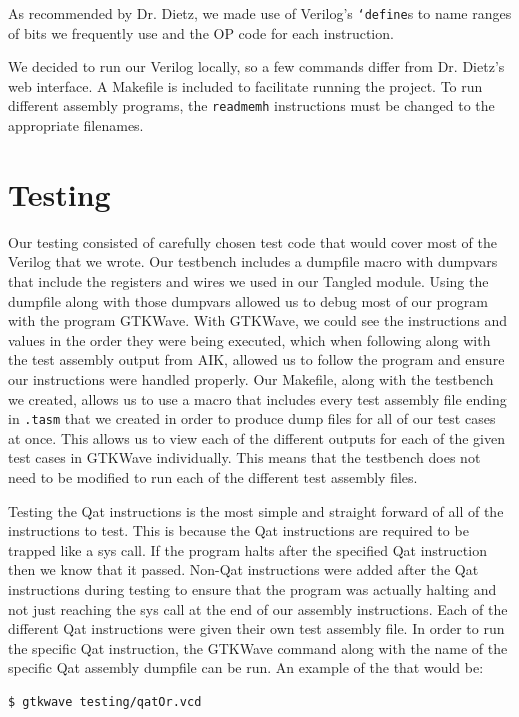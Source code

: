 \documentclass[sigconf, nonacm=true, screen=true]{acmart}
\begin{document}
As recommended by Dr. Dietz, we made use of Verilog's \texttt{`define}s to name ranges of bits we frequently use and the OP code for each instruction.

We decided to run our Verilog locally, so a few commands differ from Dr. Dietz's web interface. A Makefile is included to facilitate running the project. To run different assembly programs, the \texttt{readmemh} instructions must be changed to the appropriate filenames.


\section{Testing}
Our testing consisted of carefully chosen test code that would cover most of the Verilog that we wrote. Our testbench includes a dumpfile macro with dumpvars that include the registers and wires we used in our Tangled module. Using the dumpfile along with those dumpvars allowed us to debug most of our program with the program GTKWave. With GTKWave, we could see the instructions and values in the order they were being executed, which when following along with the test assembly output from AIK, allowed us to follow the program and ensure our instructions were handled properly. Our Makefile, along with the testbench we created, allows us to use a macro that includes every test assembly file ending in \texttt{.tasm} that we created in order to produce dump files for all of our test cases at once. This allows us to view each of the different outputs for each of the given test cases in GTKWave individually. This means that the testbench does not need to be modified to run each of the different test assembly files.


Testing the Qat instructions is the most simple and straight forward of all of the instructions to test. This is because the Qat instructions are required to be trapped like a sys call. If the program halts after the specified Qat instruction then we know that it passed. Non-Qat instructions were added after the Qat instructions during testing to ensure that the program was actually halting and not just reaching the sys call at the end of our assembly instructions. Each of the different Qat instructions were given their own test assembly file. In order to run the specific Qat instruction, the GTKWave command along with the name of the specific Qat assembly dumpfile can be run. An example of the that would be:

\begin{lstlisting}[language=bash]
$ gtkwave testing/qatOr.vcd
\end{lstlisting}
\end{document}

